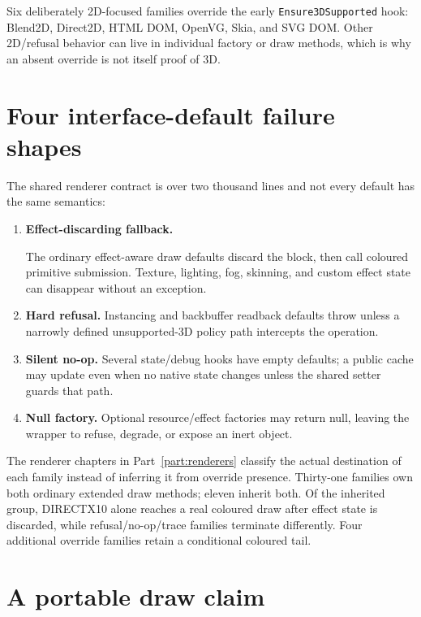 Six deliberately 2D-focused families override the early \texttt{Ensure3DSupported} hook:
Blend2D, Direct2D, HTML DOM, OpenVG, Skia, and SVG DOM.  Other 2D/refusal behavior can live in
individual factory or draw methods, which is why an absent override is not itself proof of 3D.

\section{Four interface-default failure shapes}

The shared renderer contract is over two thousand lines and not every default has the same
semantics:

\begin{enumerate}
  \item \textbf{Effect-discarding fallback.}\par
        The ordinary effect-aware draw defaults discard the  block, then
        call coloured primitive submission.  Texture, lighting, fog,
        skinning, and custom effect state can disappear without an exception.
  \item \textbf{Hard refusal.} Instancing and backbuffer readback defaults throw unless a narrowly
        defined unsupported-3D policy path intercepts the operation.
  \item \textbf{Silent no-op.} Several state/debug hooks have empty defaults; a public cache may
        update even when no native state changes unless the shared setter guards that path.
  \item \textbf{Null factory.} Optional resource/effect factories may return null, leaving the
        wrapper to refuse, degrade, or expose an inert object.
\end{enumerate}

The renderer chapters in Part~\ref{part:renderers} classify the actual destination of each family instead of inferring it
from override presence.  Thirty-one families own both ordinary extended draw methods; eleven
inherit both.  Of the inherited group, DIRECTX10 alone reaches a real coloured draw after effect
state is discarded, while refusal/no-op/trace families terminate differently.  Four additional
override families retain a conditional coloured tail.

\section{A portable draw claim}

